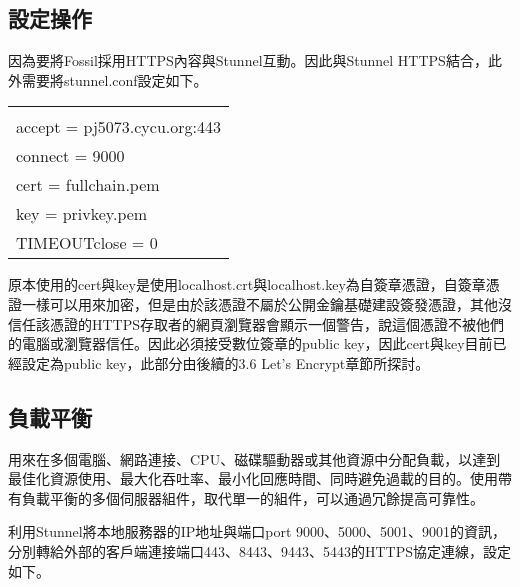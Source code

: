 \subsection{設定操作}
\par
\renewcommand{\baselinestretch}{1} %
\twelve \qquad 因為要將Fossil採用HTTPS內容與Stunnel互動。因此與Stunnel HTTPS結合，此外需要將stunnel.conf設定如下。
\\
\par
\begin{center}
\begin{tabular}{||p{15cm}|} %
\hline
[https]
\\
accept = pj5073.cycu.org:443
\\
connect = 9000
\\
cert = fullchain.pem
\\
key = privkey.pem
\\
TIMEOUTclose = 0
\\
\hline
\end{tabular}
\end{center}
\clearpage %
\par
\renewcommand{\baselinestretch}{1} %
\twelve \hspace{0.5em} 原本使用的cert與key是使用localhost.crt與localhost.key為自簽章憑證，自簽章憑證一樣可以用來加密，但是由於該憑證不屬於公開金鑰基礎建設簽發憑證，其他沒信任該憑證的HTTPS存取者的網頁瀏覽器會顯示一個警告，說這個憑證不被他們的電腦或瀏覽器信任。因此必須接受數位簽章的public key，因此cert與key目前已經設定為public key，此部分由後續的3.6 Let's Encrypt章節所探討。
\par
\renewcommand{\baselinestretch}{20} %
\subsection{負載平衡}
\par
\renewcommand{\baselinestretch}{1} %
\twelve \qquad 用來在多個電腦、網路連接、CPU、磁碟驅動器或其他資源中分配負載，以達到最佳化資源使用、最大化吞吐率、最小化回應時間、同時避免過載的目的。使用帶有負載平衡的多個伺服器組件，取代單一的組件，可以通過冗餘提高可靠性。
\\
\par
\renewcommand{\baselinestretch}{1} %
\twelve \hspace{0.5em} 利用Stunnel將本地服務器的IP地址與端口port 9000、5000、5001、9001的資訊，分別轉給外部的客戶端連接端口443、8443、9443、5443的HTTPS協定連線，設定如下。

